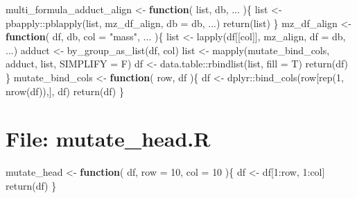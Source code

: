 \documentclass[
]{article}
\newenvironment{Shaded}{\begin{snugshade}}{\end{snugshade}}
\newcommand{\AttributeTok}[1]{\textcolor[rgb]{0.77,0.63,0.00}{#1}}
\newcommand{\ControlFlowTok}[1]{\textcolor[rgb]{0.13,0.29,0.53}{\textbf{#1}}}
\newcommand{\DecValTok}[1]{\textcolor[rgb]{0.00,0.00,0.81}{#1}}
\newcommand{\FunctionTok}[1]{\textcolor[rgb]{0.00,0.00,0.00}{#1}}
\newcommand{\NormalTok}[1]{#1}
\newcommand{\OtherTok}[1]{\textcolor[rgb]{0.56,0.35,0.01}{#1}}
\newcommand{\SpecialCharTok}[1]{\textcolor[rgb]{0.00,0.00,0.00}{#1}}
\newcommand{\StringTok}[1]{\textcolor[rgb]{0.31,0.60,0.02}{#1}}
\begin{document}
\begin{Shaded}
\begin{Highlighting}[]
\NormalTok{multi\_formula\_adduct\_align }\OtherTok{\textless{}{-}} 
  \ControlFlowTok{function}\NormalTok{(}
\NormalTok{           list,}
\NormalTok{           db,}
\NormalTok{           ...}
\NormalTok{           )\{}
\NormalTok{    list }\OtherTok{\textless{}{-}}\NormalTok{ pbapply}\SpecialCharTok{::}\FunctionTok{pblapply}\NormalTok{(list, mz\_df\_align, }\AttributeTok{db =}\NormalTok{ db, ...)}
    \FunctionTok{return}\NormalTok{(list)}
\NormalTok{  \}}
\NormalTok{mz\_df\_align }\OtherTok{\textless{}{-}} 
  \ControlFlowTok{function}\NormalTok{(}
\NormalTok{           df,}
\NormalTok{           db,}
           \AttributeTok{col =} \StringTok{"mass"}\NormalTok{,}
\NormalTok{           ...}
\NormalTok{           )\{}
\NormalTok{    list }\OtherTok{\textless{}{-}} \FunctionTok{lapply}\NormalTok{(df[[col]], mz\_align, }\AttributeTok{df =}\NormalTok{ db, ...)}
\NormalTok{    adduct }\OtherTok{\textless{}{-}} \FunctionTok{by\_group\_as\_list}\NormalTok{(df, col)}
\NormalTok{    list }\OtherTok{\textless{}{-}} \FunctionTok{mapply}\NormalTok{(mutate\_bind\_cols, adduct, list, }\AttributeTok{SIMPLIFY =}\NormalTok{ F)}
\NormalTok{    df }\OtherTok{\textless{}{-}}\NormalTok{ data.table}\SpecialCharTok{::}\FunctionTok{rbindlist}\NormalTok{(list, }\AttributeTok{fill =}\NormalTok{ T)}
    \FunctionTok{return}\NormalTok{(df)}
\NormalTok{  \}}
\NormalTok{mutate\_bind\_cols }\OtherTok{\textless{}{-}} 
  \ControlFlowTok{function}\NormalTok{(}
\NormalTok{           row,}
\NormalTok{           df}
\NormalTok{           )\{}
\NormalTok{    df }\OtherTok{\textless{}{-}}\NormalTok{ dplyr}\SpecialCharTok{::}\FunctionTok{bind\_cols}\NormalTok{(row[}\FunctionTok{rep}\NormalTok{(}\DecValTok{1}\NormalTok{, }\FunctionTok{nrow}\NormalTok{(df)),], df)}
    \FunctionTok{return}\NormalTok{(df)}
\NormalTok{  \}}
\end{Highlighting}
\end{Shaded}

\hypertarget{file-mutate_head.r}{%
\section{File: mutate\_head.R}\label{file-mutate_head.r}}

\begin{Shaded}
\begin{Highlighting}[]
\NormalTok{mutate\_head }\OtherTok{\textless{}{-}} 
  \ControlFlowTok{function}\NormalTok{(}
\NormalTok{           df,}
           \AttributeTok{row =} \DecValTok{10}\NormalTok{,}
           \AttributeTok{col =} \DecValTok{10}
\NormalTok{           )\{}
\NormalTok{    df }\OtherTok{\textless{}{-}}\NormalTok{ df[}\DecValTok{1}\SpecialCharTok{:}\NormalTok{row, }\DecValTok{1}\SpecialCharTok{:}\NormalTok{col]}
    \FunctionTok{return}\NormalTok{(df)}
\NormalTok{  \}}
\end{Highlighting}
\end{Shaded}
\end{document}

